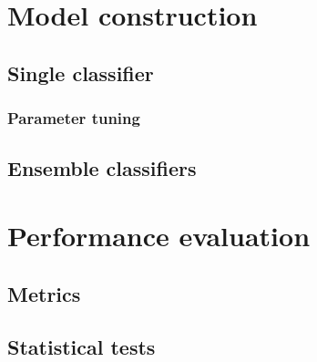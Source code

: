 \section{Model construction}

\subsection{Single classifier}

\subsubsection{Parameter tuning}

\subsection{Ensemble classifiers}

\section{Performance evaluation} %

\subsection{Metrics}

\subsection{Statistical tests}
